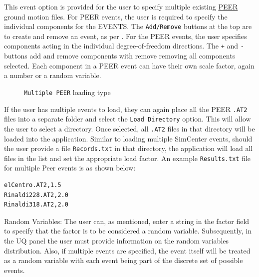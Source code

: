 This event option is provided for the user to specify multiple existing
\href{http://peer.berkeley.edu}{PEER} ground
motion files.  For PEER events, the user is required to specify the
individual components for the EVENTS.  The \texttt{Add/Remove} buttons
at the top are to create and remove an event, as
per . For the PEER events, the user
specifies components acting in the individual degree-of-freedom
directions.  The \texttt{+} and \texttt{-} buttons add and remove
components with remove removing all components selected. Each
component in a PEER event can have their own scale factor, again a
number or a random variable.

\begin{figure}[!htbp]
  \caption{\texttt{Multiple PEER} loading type}
  \label{fig:figure6}
\end{figure}

If the user has multiple events to load, they can again place all the
PEER \texttt{.AT2} files into a separate folder and select
the \texttt{Load Directory} option. This will allow the user to select
a directory. Once selected, all \texttt{.AT2} files in that directory will be
loaded into the application. Similar to loading multiple SimCenter
events, should the user provide a file \texttt{Records.txt} in that
directory, the application will load all files in the list and set the
appropriate load factor. An example \texttt{Results.txt} file for multiple Peer
events is as shown below:

\begin{verbatim}
elCentro.AT2,1.5
Rinaldi228.AT2,2.0
Rinaldi318.AT2,2.0
\end{verbatim}

Random Variables: The user can, as mentioned, enter a string in the
factor field to specify that the factor is to be considered a random
variable. Subsequently, in the UQ panel the user must provide
information on the random variables distribution. Also, if multiple
events are specified, the event itself will be treated as a random
variable with each event being part of the discrete set of possible
events.
